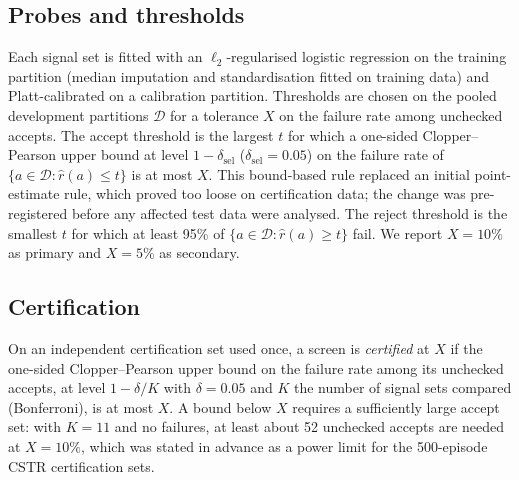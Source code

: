 \subsection{Probes and thresholds}
Each signal set is fitted with an $\ell_2$-regularised logistic regression on the training partition (median
imputation and standardisation fitted on training data) and Platt-calibrated on a calibration partition. Thresholds
are chosen on the pooled development partitions $\mathcal D$ for a tolerance $X$ on the failure rate among unchecked
accepts. The accept threshold is the largest $t$ for which a one-sided Clopper--Pearson upper bound
\citep{clopper1934} at level $1-\delta_{\mathrm{sel}}$ ($\delta_{\mathrm{sel}}=0.05$) on the failure rate of
$\{a\in\mathcal D:\hat r(a)\le t\}$ is at most $X$. This bound-based rule replaced an initial point-estimate rule,
which proved too loose on certification data; the change was pre-registered before any affected test data were
analysed. The reject threshold is the smallest $t$ for which at least 95\% of $\{a\in\mathcal D:\hat r(a)\ge t\}$
fail. We report $X=10\%$ as primary and $X=5\%$ as secondary.

\subsection{Certification}
On an independent certification set used once, a screen is \emph{certified} at $X$ if the one-sided Clopper--Pearson
upper bound on the failure rate among its unchecked accepts, at level $1-\delta/K$ with $\delta=0.05$ and $K$ the
number of signal sets compared (Bonferroni), is at most $X$. A bound below $X$ requires a sufficiently large accept
set: with $K=11$ and no failures, at least about 52 unchecked accepts are needed at $X=10\%$, which was stated in
advance as a power limit for the 500-episode CSTR certification sets.

